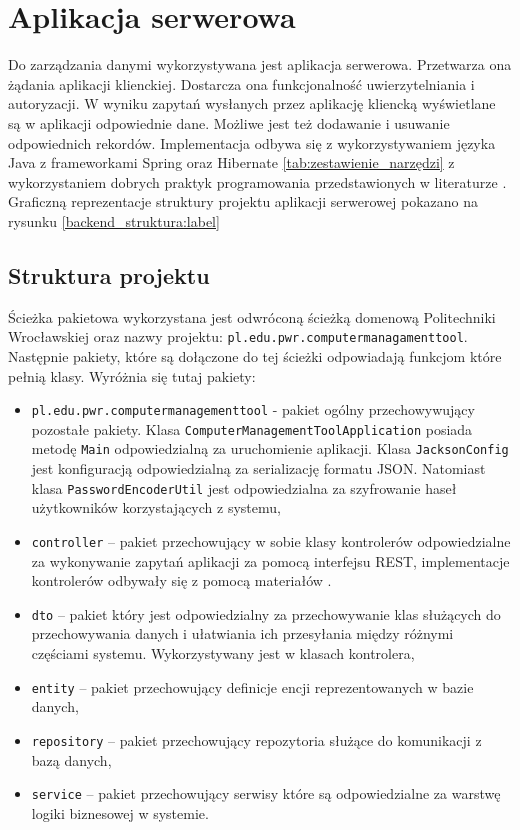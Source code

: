 \section{Aplikacja serwerowa}
Do zarządzania danymi wykorzystywana jest aplikacja serwerowa. Przetwarza ona żądania aplikacji klienckiej. Dostarcza ona funkcjonalność uwierzytelniania i autoryzacji. W wyniku zapytań wysłanych przez aplikację kliencką wyświetlane są w aplikacji odpowiednie dane. Możliwe jest też dodawanie i usuwanie odpowiednich rekordów. Implementacja odbywa się z wykorzystywaniem języka Java z frameworkami Spring oraz Hibernate \ref{tab:zestawienie_narzędzi} z wykorzystaniem dobrych praktyk programowania przedstawionych w literaturze \cite{javaep}. Graficzną reprezentacje struktury projektu aplikacji serwerowej pokazano na rysunku \ref{backend_struktura:label}

\subsection{Struktura projektu}
Ścieżka pakietowa wykorzystana jest odwróconą ścieżką domenową Politechniki Wrocławskiej oraz nazwy projektu: \texttt{pl.edu.pwr.computermanagamenttool}. Następnie pakiety, które są dołączone do tej ścieżki odpowiadają funkcjom które pełnią klasy. Wyróżnia się tutaj pakiety:
\begin{itemize} %
\item \texttt{pl.edu.pwr.computermanagementtool} - pakiet ogólny przechowywujący pozostałe pakiety. Klasa \texttt{ComputerManagementToolApplication} posiada metodę \texttt{Main} odpowiedzialną za uruchomienie aplikacji. Klasa \texttt{JacksonConfig} jest konfiguracją odpowiedzialną za serializację formatu JSON. Natomiast klasa \texttt{PasswordEncoderUtil} jest odpowiedzialna za szyfrowanie haseł użytkowników korzystających z systemu,
\item \texttt{controller} -- pakiet przechowujący w sobie klasy kontrolerów odpowiedzialne za wykonywanie zapytań aplikacji za pomocą interfejsu REST, implementacje kontrolerów odbywały się z pomocą materiałów \cite{springrest, javarest}.
\item \texttt{dto} -- pakiet który jest odpowiedzialny za przechowywanie klas służących do przechowywania danych i ułatwiania ich przesyłania między różnymi częściami systemu. Wykorzystywany jest w klasach kontrolera,
\item \texttt{entity} -- pakiet przechowujący definicje encji reprezentowanych w bazie danych,
\item \texttt{repository} -- pakiet przechowujący repozytoria służące do komunikacji z bazą danych,
\item \texttt{service} -- pakiet przechowujący serwisy które są odpowiedzialne za warstwę logiki biznesowej w systemie.
\end{itemize}


